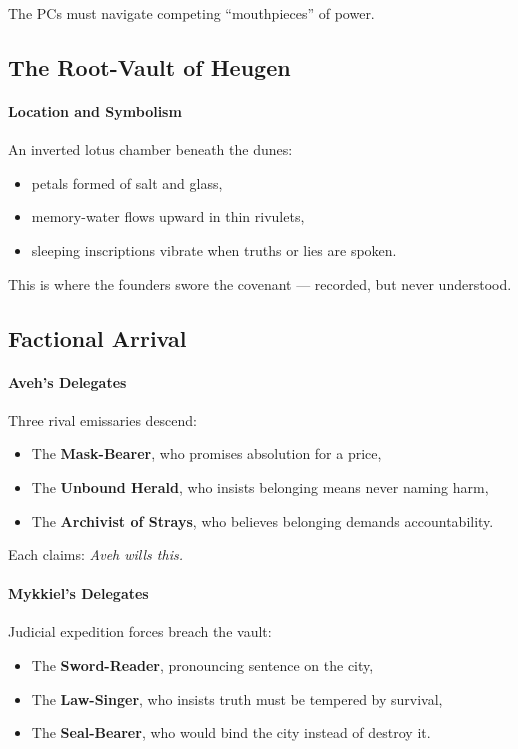\documentclass[11pt]{article}
\begin{document}
The PCs must navigate competing ``mouthpieces'' of power.

\bigskip

\subsection*{The Root-Vault of Heugen}

\paragraph{Location and Symbolism}
An inverted lotus chamber beneath the dunes:
\begin{itemize}[leftmargin=*]
  \item petals formed of salt and glass,
  \item memory-water flows upward in thin rivulets,
  \item sleeping inscriptions vibrate when truths or lies are spoken.
\end{itemize}

This is where the founders swore the covenant --- recorded, but never understood.

\bigskip

\subsection*{Factional Arrival}

\paragraph{Aveh's Delegates}
Three rival emissaries descend:
\begin{itemize}[leftmargin=*]
  \item The \textbf{Mask-Bearer}, who promises absolution for a price,
  \item The \textbf{Unbound Herald}, who insists belonging means never naming harm,
  \item The \textbf{Archivist of Strays}, who believes belonging demands accountability.
\end{itemize}

Each claims:
\emph{Aveh wills this.}

\bigskip

\paragraph{Mykkiel's Delegates}
Judicial expedition forces breach the vault:
\begin{itemize}[leftmargin=*]
  \item The \textbf{Sword-Reader}, pronouncing sentence on the city,
  \item The \textbf{Law-Singer}, who insists truth must be tempered by survival,
  \item The \textbf{Seal-Bearer}, who would bind the city instead of destroy it.
\end{itemize}
\end{document}
